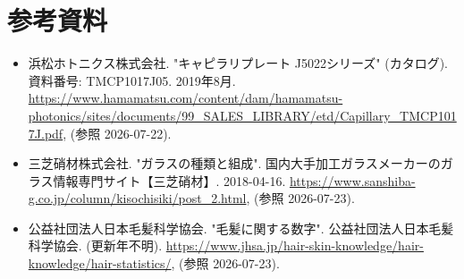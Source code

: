 \documentclass[titlepage,fontsize=10.5pt]{jlreq}
\begin{document}
\section{参考資料}
\begin{itemize}
    \item   浜松ホトニクス株式会社. "キャピラリプレート J5022シリーズ" (カタログ). 資料番号: TMCP1017J05. 2019年8月. \url{https://www.hamamatsu.com/content/dam/hamamatsu-photonics/sites/documents/99_SALES_LIBRARY/etd/Capillary_TMCP1017J.pdf}, (参照 2026-07-22).
    \item 三芝硝材株式会社. "ガラスの種類と組成". 国内大手加工ガラスメーカーのガラス情報専門サイト【三芝硝材】. 2018-04-16. \url{https://www.sanshiba-g.co.jp/column/kisochisiki/post_2.html}, (参照 2026-07-23).
    \item 公益社団法人日本毛髪科学協会. "毛髪に関する数字". 公益社団法人日本毛髪科学協会. (更新年不明). \url{https://www.jhsa.jp/hair-skin-knowledge/hair-knowledge/hair-statistics/}, (参照 2026-07-23).
\end{itemize}
\end{document}
